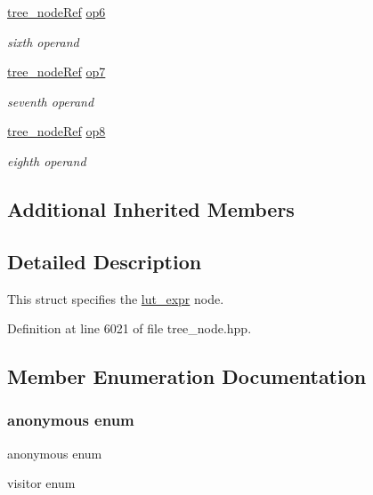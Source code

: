 \begin{DoxyCompactItemize}
\hyperlink{tree__node_8hpp_a6ee377554d1c4871ad66a337eaa67fd5}{tree\+\_\+node\+Ref} \hyperlink{structlut__expr_a74384517b4a0f823d0374fc8b394af63}{op6}
\begin{DoxyCompactList}\small\item\em sixth operand \end{DoxyCompactList}\item 
\hyperlink{tree__node_8hpp_a6ee377554d1c4871ad66a337eaa67fd5}{tree\+\_\+node\+Ref} \hyperlink{structlut__expr_a0ae07e374e2ec8619f31ead11a44d0a9}{op7}
\begin{DoxyCompactList}\small\item\em seventh operand \end{DoxyCompactList}\item 
\hyperlink{tree__node_8hpp_a6ee377554d1c4871ad66a337eaa67fd5}{tree\+\_\+node\+Ref} \hyperlink{structlut__expr_a401cc5d7665c69b84ac3d60c91387a1a}{op8}
\begin{DoxyCompactList}\small\item\em eighth operand \end{DoxyCompactList}\end{DoxyCompactItemize}
\subsection*{Additional Inherited Members}


\subsection{Detailed Description}
This struct specifies the \hyperlink{structlut__expr}{lut\+\_\+expr} node. 

Definition at line 6021 of file tree\+\_\+node.\+hpp.



\subsection{Member Enumeration Documentation}
\mbox{\label{structlut__expr_a86c4d55edc408fd38d38262743e9a06d}} 
\subsubsection{\texorpdfstring{anonymous enum}{anonymous enum}}
{\footnotesize\ttfamily anonymous enum}



visitor enum 

